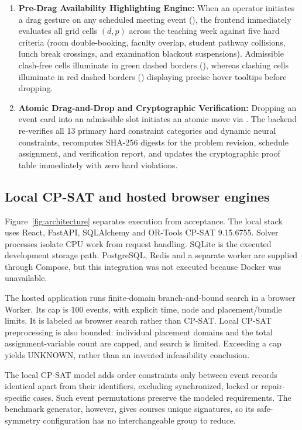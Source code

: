\documentclass[pdflatex,sn-mathphys-num]{sn-jnl}
\theoremstyle{thmstyleone}
\theoremstyle{thmstyletwo}
\theoremstyle{thmstylethree}
\newcommand{\code}[1]{\texttt{\small\detokenize{#1}}}
\begin{document}
\begin{enumerate}
\item \textbf{Pre-Drag Availability Highlighting Engine:} When an operator initiates a drag gesture on any scheduled meeting event (\code{onDragStart}), the frontend immediately evaluates all grid cells $(d, p)$ across the teaching week against five hard criteria (room double-booking, faculty overlap, student pathway collisions, lunch break crossings, and examination blackout suspensions). Admissible clash-free cells illuminate in green dashed borders (\code{valid-slot}), whereas clashing cells illuminate in red dashed borders (\code{clash-slot}) displaying precise hover tooltips before dropping.
\item \textbf{Atomic Drag-and-Drop and Cryptographic Verification:} Dropping an event card into an admissible slot initiates an atomic move via \code{/move-slot}. The backend re-verifies all 13 primary hard constraint categories and dynamic neural constraints, recomputes SHA-256 digests for the problem revision, schedule assignment, and verification report, and updates the cryptographic proof table immediately with zero hard violations.
\end{enumerate}

\subsection{Local CP-SAT and hosted browser engines}

Figure~\ref{fig:architecture} separates execution from acceptance. The local stack uses React, FastAPI, SQLAlchemy and OR-Tools CP-SAT 9.15.6755. Solver processes isolate CPU work from request handling. SQLite is the executed development storage path. PostgreSQL, Redis and a separate worker are supplied through Compose, but this integration was not executed because Docker was unavailable.

The hosted application runs finite-domain branch-and-bound search in a browser Worker. Its cap is 100 events, with explicit time, node and placement/bundle limits. It is labeled as browser search rather than CP-SAT. Local CP-SAT preprocessing is also bounded: individual placement domains and the total assignment-variable count are capped, and search is limited. Exceeding a cap yields UNKNOWN, rather than an invented infeasibility conclusion.

The local CP-SAT model adds order constraints only between event records identical apart from their identifiers, excluding synchronized, locked or repair-specific cases. Such event permutations preserve the modeled requirements. The benchmark generator, however, gives courses unique signatures, so its safe-symmetry configuration has no interchangeable group to reduce.
\end{document}
